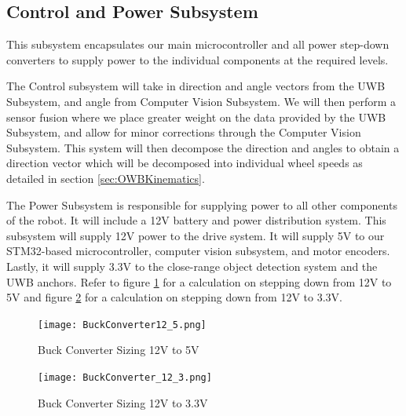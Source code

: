 \documentclass[journal,onecolumn, draftclsnofoot, 12pt]{IEEEtran}
\begin{document}
\subsection{Control and Power Subsystem}
This subsystem encapsulates our main microcontroller and all power step-down converters to supply power to the individual components at the required levels. 

The Control subsystem will take in direction and angle vectors from the UWB Subsystem, and angle from Computer Vision Subsystem. We will then perform a sensor fusion where we place greater weight on the data provided by the UWB Subsystem, and allow for minor corrections through the Computer Vision Subsystem. This system will then decompose the direction and angles to obtain a direction vector which will be decomposed into individual wheel speeds as detailed in section \ref{sec:OWBKinematics}.

The Power Subsystem is responsible for supplying power to all other components of the robot. It will include a 12V battery and power distribution system. This subsystem will supply 12V power to the drive system. It will supply 5V to our STM32-based microcontroller, computer vision subsystem, and motor encoders. Lastly, it will supply 3.3V to the close-range object detection system and the UWB anchors. Refer to figure \ref{fig:Buck_12_5} for a calculation on stepping down from 12V to 5V and figure \ref{fig:Buck_12_3} for a calculation on stepping down from 12V to 3.3V.

\begin{figure}[H]
\begin{center}
    \texttt{[image: BuckConverter12\_5.png]}\\
    \caption{ Buck Converter Sizing 12V to 5V  } 
    \label{fig:Buck_12_5}
\end{center}
\end{figure}

\begin{figure}[H]
\begin{center}
    \texttt{[image: BuckConverter\_12\_3.png]}\\
    \caption{ Buck Converter Sizing 12V to 3.3V  } 
    \label{fig:Buck_12_3}
\end{center}
\end{figure}
\end{document}
